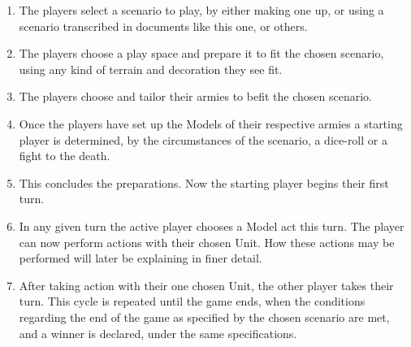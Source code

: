 \documentclass[a4paper,12pt]{book}
\begin{document}
\begin{adjustwidth}{-2cm}{-2cm}
\begin{multicols}{2}
\begin{enumerate}

	\item The players select a scenario to play, by either making one up, or using a scenario transcribed in documents like this one, or others.
	\item The players choose a play space and prepare it to fit the chosen scenario, using any kind of terrain and decoration they see fit.
	\item The players choose and tailor their armies to befit the chosen scenario.
 	\item Once the players have set up the Models of their respective armies a starting player is determined, by the circumstances of the scenario, a dice-roll or a fight to the death.
	\item This concludes the preparations. Now the starting player begins their first turn.
	\item In any given turn the active player chooses a Model act this turn. The player can now perform actions with their chosen Unit. How these actions may be performed will later be explaining in finer detail.
	\item After taking action with their one chosen Unit, the other player takes their turn. This cycle is repeated until the game ends, when the conditions regarding the end of the game as specified by the chosen scenario are met, and a winner is declared, under the same specifications.
	
\end{enumerate}
\end{multicols}
\end{adjustwidth}
\end{document}
